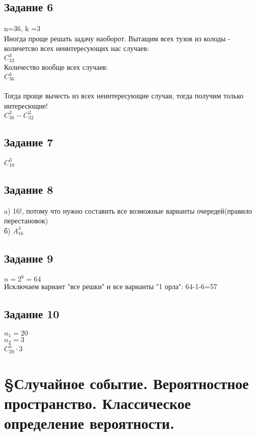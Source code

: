 \documentclass[12pt]{article}
\begin{document}
\newpage
\subsection{Задание 6}

n=36, k =3\\
Иногда проще решать задачу наоборот. Вытащим всех тузов из колоды - количетсво всех неинтересующих нас случаев:\\
 $C_{32}^{3}$\\
Количество вообще всех случаев:\\
$C_{36}^{3}$\\
\\
Тогда проще вычесть из всех неинтересующие случаи, тогда получим только интересющие!\\
$C_{36}^{3} -  C_{32}^{3}$\\

\newpage
\subsection{Задание 7}

$C_{10}^{3}$\\

\newpage
\subsection{Задание 8}

a) 16!, потому что нужно составить все возможные варианты очередей(правило перестановок)\\
б) $A_{16}^{3}$

\newpage
\subsection{Задание 9}

$n=2^6=64$\\
Исключаем вариант "все решки" и все варианты "1 орла": 64-1-6=57\\

\newpage
\subsection{Задание 10}

$n_1=20$\\
$n_2=3$\\
$C_{20}^5\cdot3$

\newpage
\section{\S Случайное событие. Вероятностное пространство. Классическое определение вероятности.}
\end{document}

